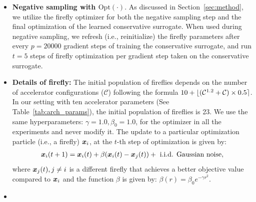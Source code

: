 \begin{itemize}
    \item \textbf{Negative sampling with $\mathrm{Opt}(\cdot)$}. As discussed in Section~\ref{sec:method}, we utilize the firefly optimizer for both the negative sampling step and the final optimization of the learned conservative surrogate. When used during negative sampling, we refresh (i.e., reinitialize) the firefly parameters after every $p = 20000$ gradient steps of training the conservative surrogate, and run $t = 5$ steps of firefly optimization per gradient step taken on the conservative surrogate. 
    \item \textbf{Details of firefly:} The initial population of fireflies depends on the number of accelerator configurations ($\mathcal{C}$) following the formula $10+\lfloor(\mathcal{C}^{1.2}+\mathcal{C})\times0.5\rceil$. In our setting with ten accelerator parameters (See Table~\ref{tab:arch_params}), the initial population of fireflies is 23. We use the same hyperparameters: $\gamma = 1.0, \beta_0 = 1.0$, for the optimizer in all the experiments and never modify it. The update to a particular optimization particle (i.e., a firefly) ${\boldsymbol{x}}_i$, at the $t$-th step of optimization is given by: 
    \begin{equation}
    \label{eqn:firefly1}
    \begin{aligned}
    {{\boldsymbol{x}}_{i}(t+1) = {\boldsymbol{x}}_{i}(t) + \beta({\boldsymbol{x}}_{i}(t) - {\boldsymbol{x}}_{j}(t)) + ~\text{i.i.d. Gaussian noise},}
    \end{aligned}
    \end{equation}
    where ${\boldsymbol{x}}_j(t), j \neq i$ is a different firefly that achieves a better objective value compared to ${\boldsymbol{x}}_i$ and the function $\beta$ is given by: $\beta(r) = \beta_{0}e^{-\gamma{}r^2}$.
    \item {}
    

\end{itemize}
